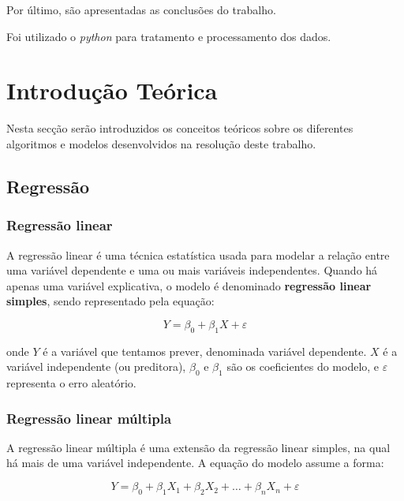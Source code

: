\documentclass[conference]{IEEEtran}
\begin{document}
Por último, são apresentadas as conclusões do  trabalho.

Foi utilizado o \textit{python} para tratamento e processamento dos dados.

\section{Introdução Teórica}

Nesta secção serão introduzidos os conceitos teóricos sobre os diferentes algoritmos e modelos desenvolvidos na resolução deste trabalho. 

\subsection{Regressão}

\subsubsection{Regressão linear}


A regressão linear é uma técnica estatística usada para modelar a relação entre uma variável dependente e uma ou mais variáveis independentes. Quando há apenas uma variável explicativa, o modelo é denominado \textbf{regressão linear simples}, sendo representado pela equação:

\begin{equation}
	Y = \beta_0 + \beta_1 X + \varepsilon
\end{equation}

onde \( Y \) é a variável que tentamos prever, denominada variável dependente. \( X \) é a variável independente (ou preditora), \( \beta_0 \) e \( \beta_1 \) são os coeficientes do modelo, e \( \varepsilon \) representa o erro aleatório. \cite{madureira2024aed}

\subsubsection{Regressão linear múltipla}
A regressão linear múltipla é uma extensão da regressão linear simples, na qual há mais de uma variável independente. A equação do modelo assume a forma:

\begin{equation}
	Y = \beta_0 + \beta_1 X_1 + \beta_2 X_2 + \dots + \beta_n X_n + \varepsilon
\end{equation}
\end{document}
